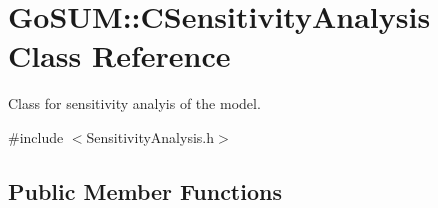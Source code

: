 \hypertarget{class_go_s_u_m_1_1_c_sensitivity_analysis}{\section{Go\-S\-U\-M\-:\-:C\-Sensitivity\-Analysis Class Reference}
\label{class_go_s_u_m_1_1_c_sensitivity_analysis}
}


Class for sensitivity analyis of the model.  




{\ttfamily \#include $<$Sensitivity\-Analysis.\-h$>$}

\subsection*{Public Member Functions}
